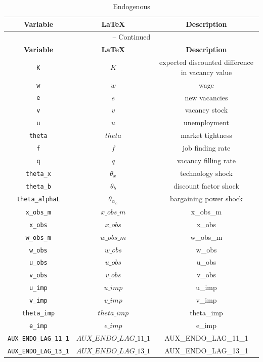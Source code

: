 \begin{center}
\begin{longtable}{ccc}
\caption{Endogenous}\\%
\hline%
\multicolumn{1}{c}{\textbf{Variable}} &
\multicolumn{1}{c}{\textbf{\LaTeX}} &
\multicolumn{1}{c}{\textbf{Description}}\\%
\hline\hline%
\endfirsthead
\multicolumn{3}{c}{{\tablename} \thetable{} -- Continued}\\%
\hline%
\multicolumn{1}{c}{\textbf{Variable}} &
\multicolumn{1}{c}{\textbf{\LaTeX}} &
\multicolumn{1}{c}{\textbf{Description}}\\%
\hline\hline%
\endhead
\texttt{K} & ${K}$ & expected discounted difference in vacancy value\\
\texttt{w} & ${w}$ & wage\\
\texttt{e} & ${e}$ & new vacancies\\
\texttt{v} & ${v}$ & vacancy stock\\
\texttt{u} & ${u}$ & unemployment\\
\texttt{theta} & ${theta}$ & market tightness\\
\texttt{f} & ${f}$ & job finding rate\\
\texttt{q} & ${q}$ & vacancy filling rate\\
\texttt{theta\_x} & ${\theta_x}$ & technology shock\\
\texttt{theta\_b} & ${\theta_b}$ & discount factor shock\\
\texttt{theta\_alphaL} & ${\theta_{\alpha_L}}$ & bargaining power shock\\
\texttt{x\_obs\_m} & $x\_obs\_m$ & x\_obs\_m\\
\texttt{x\_obs} & $x\_obs$ & x\_obs\\
\texttt{w\_obs\_m} & $w\_obs\_m$ & w\_obs\_m\\
\texttt{w\_obs} & $w\_obs$ & w\_obs\\
\texttt{u\_obs} & $u\_obs$ & u\_obs\\
\texttt{v\_obs} & $v\_obs$ & v\_obs\\
\texttt{u\_imp} & $u\_imp$ & u\_imp\\
\texttt{v\_imp} & $v\_imp$ & v\_imp\\
\texttt{theta\_imp} & $theta\_imp$ & theta\_imp\\
\texttt{e\_imp} & $e\_imp$ & e\_imp\\
\texttt{AUX\_ENDO\_LAG\_11\_1} & $AUX\_ENDO\_LAG\_11\_1$ & AUX\_ENDO\_LAG\_11\_1\\
\texttt{AUX\_ENDO\_LAG\_13\_1} & $AUX\_ENDO\_LAG\_13\_1$ & AUX\_ENDO\_LAG\_13\_1\\
\hline%
\end{longtable}
\end{center}
